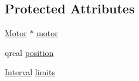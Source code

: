 \subsection*{Protected Attributes}
\begin{DoxyCompactItemize}
\item 
\hyperlink{class_robot_model_1_1_motor}{Motor} $\ast$ \hyperlink{class_robot_model_1_1_joint_a8e8165df2271b16ab446028ee6bfa1c6}{motor}
\item 
qreal \hyperlink{class_robot_model_1_1_joint_aada2db465b0f51975a3c928656a9924c}{position}
\item 
\hyperlink{class_robot_model_1_1_interval}{Interval} \hyperlink{class_robot_model_1_1_joint_a3991756cd74729b87bde02b679c95b4c}{limits}
\end{DoxyCompactItemize}


